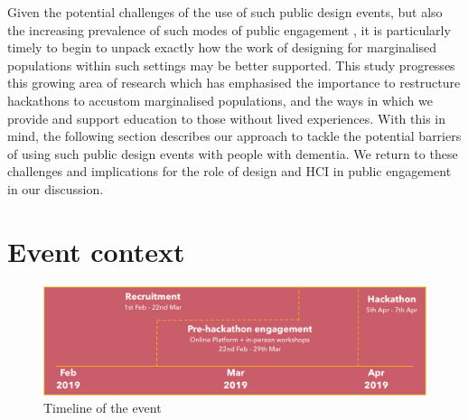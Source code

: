 Given the potential challenges of the use of such public design events, but also the increasing prevalence of such modes of public engagement \citep{yuan_open_2021, paganini_engaging_2020, endrissat_hackathons_2018}, it is particularly timely to begin to unpack exactly how the work of designing for marginalised populations within such settings may be better supported. This study progresses this growing area of research which has emphasised the importance to restructure hackathons to accustom marginalised populations, and the ways in which we provide and support education to those without lived experiences. With this in mind, the following section describes our approach to tackle the potential barriers of using such public design events with people with dementia. We return to these challenges and implications for the role of design and HCI in public engagement in our discussion.

\section{Event context}
\label{sec:DemVRContextEvent}

\begin{figure}[htp]
\centering
\includegraphics[width=.8\linewidth]{Images/DemVR/Timeline.jpg}
\caption{Timeline of the event}
\label{fig:DemVRTimeline}
\end{figure}

